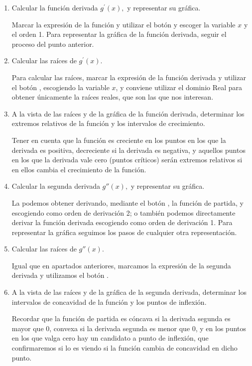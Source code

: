 \begin{enumerate}[leftmargin=*]
\begin{enumerate}
\item  Calcular la función derivada $g^{\prime }(x),$ y representar su
gráfica.
\begin{indicacion}
Marcar la expresión de la función y utilizar el botón  y escoger la variable $x$ y el orden 1. Para representar
la gráfica de la función derivada, seguir el proceso del punto anterior.
\end{indicacion}

\item  Calcular las raíces de $g^{\prime }(x).$
\begin{indicacion}
Para calcular las raíces, marcar la expresión de la función derivada y utilizar el botón , escogiendo la variable
$x$, y conviene utilizar el dominio Real para obtener únicamente la raíces reales, que son las que nos interesan.
\end{indicacion}

\item  A la vista de las raíces y de la gráfica de la función derivada, determinar los extremos relativos de la función y los intervalos de
crecimiento.
\begin{indicacion}
Tener en cuenta que la función es creciente en los puntos en los que la derivada es positiva, decreciente si la derivada es negativa, y
aquellos puntos en los que la derivada vale cero (puntos críticos) serán extremos relativos si en ellos cambia el crecimiento de la función.
\end{indicacion}

\item Calcular la segunda derivada $g''(x),$ y representar su gráfica.
\begin{indicacion}
La podemos obtener derivando, mediante el botón , la función de partida, y escogiendo como orden de derivación 2;
o también podemos directamente derivar la función derivada escogiendo como orden de derivación 1. Para representar la gráfica seguimos los
pasos de cualquier otra representación.
\end{indicacion}

\item  Calcular las raíces de $g''(x).$
\begin{indicacion}
Igual que en apartados anteriores, marcamos la expresión de la segunda derivada y utilizamos el botón .
\end{indicacion}

\item  A la vista de las raíces y de la gráfica de la segunda derivada, determinar los intervalos de concavidad de la función y los puntos
de inflexión.
\begin{indicacion}
Recordar que la función de partida es cóncava si la derivada segunda es mayor que 0, convexa si la derivada segunda es menor que 0, y en los
puntos en los que valga cero hay un candidato a punto de inflexión, que confirmaremos si lo es viendo si la función cambia de concavidad en
dicho punto.
\end{indicacion}
\end{enumerate}



\end{enumerate}
